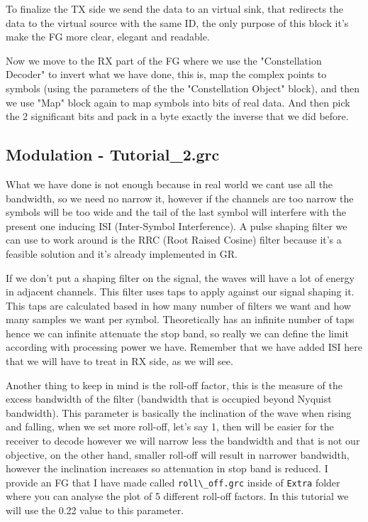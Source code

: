 \documentclass[a4paper, 10pt, conference]{ieeeconf}      %
\begin{document}
        To finalize the TX side we send the data to an virtual sink, that redirects the data to the virtual source with the same ID, the only purpose of this block it's make the FG more clear, elegant and readable.
        
        Now we move to the RX part of the FG where we use the "Constellation Decoder" to invert what we have done, this is, map the complex points to symbols (using the parameters of the the "Constellation Object" block), and then we use "Map" block again to map symbols into bits of real data. And then pick the 2 significant bits and pack in a byte exactly the inverse that we did before.
        
        
\subsection{Modulation - Tutorial\_2.grc}
    What we have done is not enough because in real world we cant use all the bandwidth, so we need no narrow it, however if the channels are too narrow the symbols will be too wide and the tail of the last symbol will interfere with the present one inducing ISI (Inter-Symbol Interference). A pulse shaping filter we can use to work around is the RRC (Root Raised Cosine) filter because it's a feasible solution and it's already implemented in GR.      
    
   If we don't put a shaping filter on the signal, the waves will have a lot of energy in adjacent channels. This filter uses taps to apply against our signal shaping it. This taps are calculated based in how many number of filters we want and how many samples we want per symbol. Theoretically has an infinite number of taps hence we can infinite attenuate the stop band, so really we can define the limit according with processing power we have. Remember that we have added ISI here that we will have to treat in RX side, as we will see.
   

    
    Another thing to keep in mind is the roll-off factor, this is the measure of the excess bandwidth of the filter (bandwidth that is occupied beyond Nyquist bandwidth). This parameter is basically the inclination of the wave when rising and falling, when we set more roll-off, let's say 1, then will be easier for the receiver to decode however we will narrow less the bandwidth and that is not our objective, on the other hand, smaller roll-off will result in narrower bandwidth, however the inclination increases so attenuation in stop band is reduced.
    I provide an FG that I have made called \verb|roll\_off.grc| inside of \verb|Extra| folder where you can analyse the plot of 5 different roll-off factors. In this tutorial we will use the 0.22 value to this parameter.
    
\end{document}
